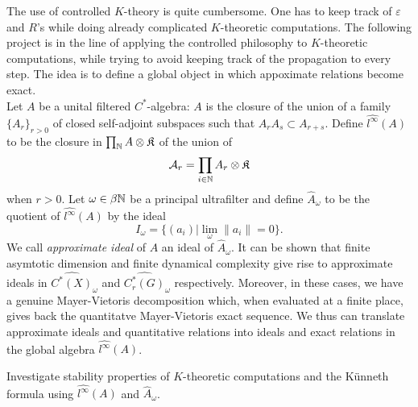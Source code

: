 The use of controlled $K$-theory is quite cumbersome. One has to keep track of $\varepsilon $ and $R$'s while doing already complicated $K$-theoretic computations. The following project is in the line of applying the controlled philosophy to $K$-theoretic computations, while trying to avoid keeping track of the propagation to every step. The idea is to define a global object in which appoximate relations become exact. \\

Let $A$ be a unital filtered $C^*$-algebra: $A$ is the closure of the union of a family  $\{A_r\}_{r>0}$ of closed self-adjoint subspaces such that $A_r A_s \subset A_{r+s}$. Define $\hat {l^\infty} (A)$ to be the closure in $\prod_{\mathbb{N}} A \otimes \mathfrak K$ of the union of 
\[\mathcal A_r = \prod_{i\in \mathbb{N}} A_r \otimes \mathfrak K \]
when $r>0$. Let $\omega\in \beta \mathbb{N}$ be a principal ultrafilter and define $\hat A_\omega$ to be the quotient of $\hat {l^\infty} (A)$ by the ideal 
\[ I_\omega = \{ (a_i) | \lim_\omega \|a_i \| = 0\}.\]
We call \textit{approximate ideal} of $A$ an ideal of $\hat A_\omega$. It can be shown that finite asymtotic dimension and finite dynamical complexity give rise to approximate ideals in $\hat{C^*(X)}_\omega$ and $\hat{C_r^*(G)}_\omega$ respectively. Moreover, in these cases, we have a genuine Mayer-Vietoris decomposition which, when evaluated at a finite place, gives back the quantitatve Mayer-Vietoris exact sequence. We thus can translate approximate ideals and quantitative relations into ideals and exact relations in the global algebra $\hat {l^\infty} (A)$.  

\begin{project}
Investigate stability properties of $K$-theoretic computations and the K\"unneth formula using $\hat {l^\infty} (A)$ and $\hat A_\omega$.
\end{project}  





























